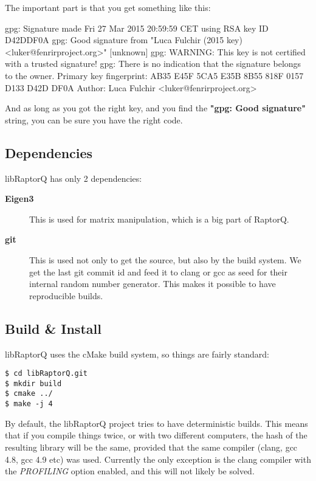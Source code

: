 \documentclass[11pt,a4paper]{refart}
\begin{document}
The important part is that you get something like this:

\begin{verbbox}[\footnotesize]
 gpg: Signature made Fri 27 Mar 2015 20:59:59 CET using RSA key ID D42DDF0A
 gpg: Good signature from "Luca Fulchir (2015 key) <luker@fenrirproject.org>"
 [unknown]
 gpg: WARNING: This key is not certified with a trusted signature!
 gpg:          There is no indication that the signature belongs to the owner.
 Primary key fingerprint: AB35 E45F 5CA5 E35B 8B55  818F 0157 D133 D42D DF0A
 Author: Luca Fulchir <luker@fenrirproject.org>
\end{verbbox}
\theverbbox

And as long as you got the right key, and you find the \textbf{"gpg: Good signature"} string,
you can be sure you have the right code.

\subsection{Dependencies}

libRaptorQ has only 2 dependencies:
\begin{description}
\item[\textbf{Eigen3}] This is used for matrix manipulation, which is a big part of RaptorQ.
\item[\textbf{git}] This is used not only to get the source, but also by the build system. We get the last git commit id and feed it to clang or gcc as seed for their
internal random number generator. This makes it possible to have reproducible builds.
\end{description}

\subsection{Build \& Install}

libRaptorQ uses the cMake build system, so things are fairly standard:

\begin{verbatim}
$ cd libRaptorQ.git
$ mkdir build
$ cmake ../
$ make -j 4
\end{verbatim}

By default, the libRaptorQ project tries to have deterministic builds. This means that if you compile things twice, or with two different computers, the
hash of the resulting library will be the same, provided that the same compiler (clang, gcc 4.8, gcc 4.9 etc) was used. Currently the only exception is the clang
compiler with the \textit{PROFILING} option enabled, and this will not likely be solved.
\end{document}
